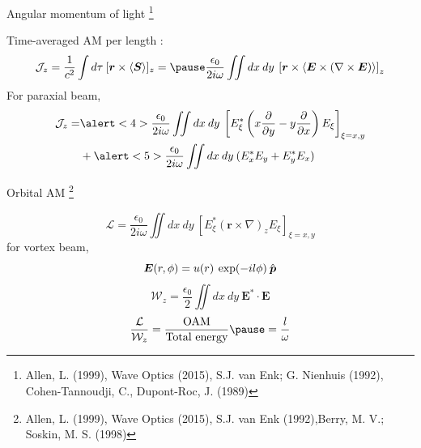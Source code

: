 \documentclass[12pt, dvipsnames]{beamer}
\numberwithin{equation}{section}
\newcommand\blfootnote[1]{%
	\begingroup
	\renewcommand\thefootnote{}\footnote{#1}%
	\addtocounter{footnote}{-1}%
	\endgroup
}
\begin{document}
\begin{frame}{Angular momentum of light}\blfootnote{Allen, L. (1999), Wave Optics (2015), S.J. van Enk; G. Nienhuis (1992), Cohen-Tannoudji, C., Dupont-Roc, J. (1989)}
	Time-averaged AM per length :
	$$\mathcal{J}_z=\frac{1}{c^2}\int d\tau\: [\boldsymbol{r}\times\expval{\boldsymbol{S}}]_z=\pause
	\frac{\epsilon_0}{2i\omega}\iint dx\:dy\: \left[\boldsymbol{r}\times\expval{\boldsymbol{E}\times (\nabla\times\boldsymbol{E})}\right]_z$$\pause
	For paraxial beam,
	\begin{align*}
		\mathcal{J}_z
		= &\alert<4>{\frac{\epsilon_0}{2i\omega} \iint dx\:dy\:\left[E_\xi^\ast\left(x\frac{\partial}{\partial y} - y\frac{\partial}{\partial x}\right)E_\xi\right]_{\xi=x,y}}
		\\
		&+\alert<5>{\frac{\epsilon_0}{2i\omega}\iint dx\:dy\: (E_x^\ast E_y + E_y^\ast E_x)}
	\end{align*}
	
	\begin{center}
	\end{center}
\end{frame}

\begin{frame}[t]{Orbital AM}\blfootnote{Allen, L. (1999), Wave Optics (2015), S.J. van Enk (1992),Berry, M. V.; Soskin, M. S. (1998)}
	\vspace{-9pt}
	$$\mathcal{L}
	= \frac{\epsilon_0}{2i\omega} \iint dx\:dy\:\left[E_\xi^\ast\left({\boldsymbol{r}}\times\nabla\right)_zE_\xi\right]_{\xi=x,y}$$\pause
	for vortex beam,
	$$\boldsymbol{E}(r,\phi)= u(r)\:\exp(-il\phi)\:\Hat{\boldsymbol{p}}$$\pause
	$$\mathcal{W}_z=\frac{\epsilon_0}{2}\iint dx\:dy\: \boldsymbol{E}^\ast\cdot\boldsymbol{E}$$\pause
	$$\frac{\mathcal{L}}{\mathcal{W}_z}  =\frac{\text{OAM}}{\text{Total energy}}\pause= \frac{l}{\omega}$$
\end{frame}
\end{document}
